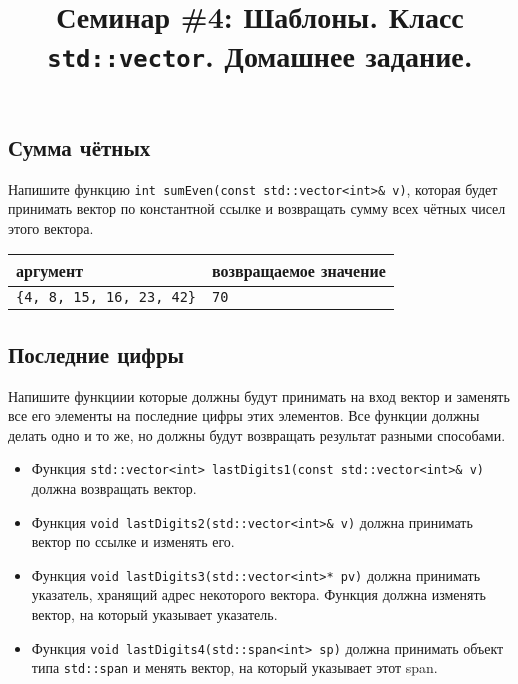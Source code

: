 \documentclass{article}
\begin{document}
\title{Семинар \#4: Шаблоны. Класс \texttt{std::vector}. Домашнее задание.\vspace{-5ex}}\date{}\maketitle

\subsection{Сумма чётных}
Напишите функцию \texttt{int sumEven(const std::vector<int>\& v)}, которая будет принимать вектор по константной ссылке и возвращать сумму всех чётных чисел этого вектора.
\begin{center}
\begin{tabular}{ l | l }
 аргумент & возвращаемое значение \\ \hline
 \texttt{\{4, 8, 15, 16, 23, 42\}} & \texttt{70}
\end{tabular}
\end{center}

\subsection{Последние цифры}
Напишите функциии которые должны будут принимать на вход вектор и заменять все его элементы на последние цифры этих элементов. Все функции должны делать одно и то же, но должны будут возвращать результат разными способами.

\begin{itemize}
\item Функция \texttt{std::vector<int> lastDigits1(const std::vector<int>\& v)} должна возвращать вектор.
\item Функция \texttt{void lastDigits2(std::vector<int>\& v)} должна принимать вектор по ссылке и изменять его.
\item Функция \texttt{void lastDigits3(std::vector<int>* pv)} должна принимать указатель, хранящий адрес некоторого вектора. Функция должна изменять вектор, на который указывает указатель.
\item Функция \texttt{void lastDigits4(std::span<int> sp)} должна принимать объект типа \texttt{std::span} и менять вектор, на который указывает этот span.
\end{itemize}
\end{document}
